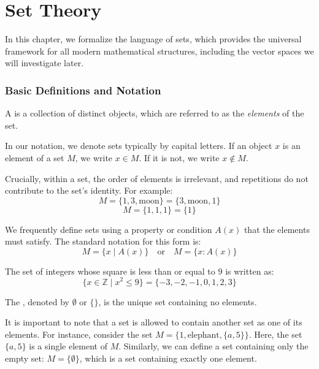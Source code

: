 \setcounter{chapter}{2}
\renewcommand{\thetheorem}{\thechapter.\arabic{theorem}}
\setcounter{theorem}{0}

\chapter{Set Theory}

In this chapter, we formalize the language of sets, which provides the universal framework for all modern mathematical structures, including the vector spaces we will investigate later.

\subsection{Basic Definitions and Notation}

\begin{definition}[Set]
A  is a collection of distinct objects, which are referred to as the \textit{elements} of the set.
\end{definition}

In our notation, we denote sets typically by capital letters. If an object $x$ is an element of a set $M$, we write $x \in M$. If it is not, we write $x \notin M$.

\begin{remark}
Crucially, within a set, the order of elements is irrelevant, and repetitions do not contribute to the set's identity. For example:
\[
M = \{1, 3, \text{moon}\} = \{3, \text{moon}, 1\}
\]
\[
M = \{1, 1, 1\} = \{1\}
\]
\end{remark}

We frequently define sets using a property or condition $A(x)$ that the elements must satisfy. The standard notation for this  form is:
\[
M = \{x \mid A(x)\} \quad \text{or} \quad M = \{x : A(x)\}
\]

\begin{example}
The set of integers whose square is less than or equal to $9$ is written as:
\[
\{x \in \mathbb{Z} \mid x^2 \le 9\} = \{-3, -2, -1, 0, 1, 2, 3\}
\]
\end{example}

\begin{definition}
The , denoted by $\emptyset$ or $\{\}$, is the unique set containing no elements.
\end{definition}

It is important to note that a set is allowed to contain another set as one of its elements. For instance, consider the set $M = \{1, \text{elephant}, \{a, 5\}\}$. Here, the set $\{a, 5\}$ is a single element of $M$. Similarly, we can define a set containing only the empty set: $M = \{\emptyset\}$, which is a set containing exactly one element.


